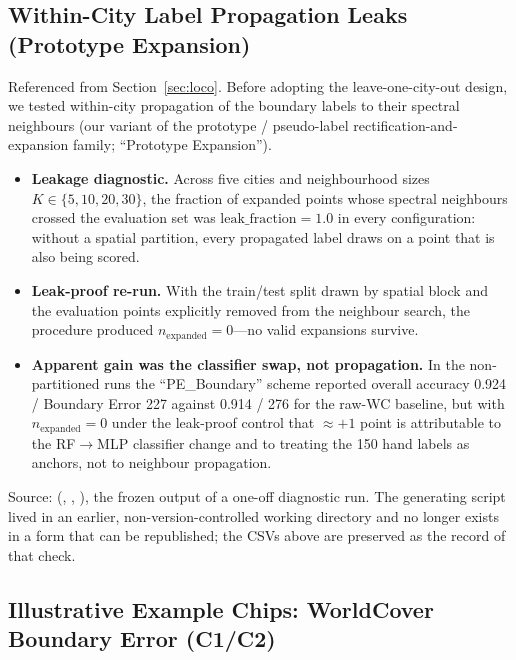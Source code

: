 \documentclass[remotesensing,article,submit,moreauthors]{Definitions/mdpi}
\begin{document}
\subsection{Within-City Label Propagation Leaks (Prototype Expansion)}\label{app:supp-s5}

Referenced from Section~\ref{sec:loco}. Before adopting the
leave-one-city-out design, we tested within-city propagation of the boundary
labels to their spectral neighbours (our variant of the prototype /
pseudo-label rectification-and-expansion family; ``Prototype Expansion'').

\begin{itemize}
\item \textbf{Leakage diagnostic.} Across five cities and neighbourhood
sizes $K \in \{5, 10, 20, 30\}$, the fraction of expanded points whose
spectral neighbours crossed the evaluation set was $\text{leak\_fraction} =
1.0$ in every configuration: without a spatial partition, every propagated
label draws on a point that is also being scored.
\item \textbf{Leak-proof re-run.} With the train/test split drawn by spatial
block and the evaluation points explicitly removed from the neighbour
search, the procedure produced $n_{\text{expanded}} = 0$---no valid
expansions survive.
\item \textbf{Apparent gain was the classifier swap, not propagation.} In the
non-partitioned runs the ``PE\_Boundary'' scheme reported overall accuracy
0.924 / Boundary Error 227 against 0.914 / 276 for the raw-WC baseline, but
with $n_{\text{expanded}} = 0$ under the leak-proof control that
$\approx +1$ point is attributable to the RF$\to$MLP classifier change and to
treating the 150 hand labels as anchors, not to neighbour propagation.
\end{itemize}

Source:  (,
, ), the
frozen output of a one-off diagnostic run. The generating script lived in an
earlier, non-version-controlled working directory and no longer exists in a
form that can be republished; the CSVs above are preserved as the record of
that check.

\subsection{Illustrative Example Chips: WorldCover Boundary Error (C1/C2)}\label{app:supp-s6}
\end{document}
